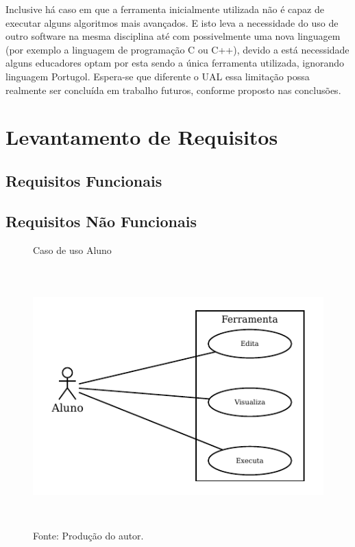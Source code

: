 Inclusive há caso em que a ferramenta inicialmente utilizada não é capaz de executar alguns algoritmos mais avançados. E isto leva a necessidade do uso de outro software na mesma disciplina até com possivelmente uma nova linguagem (por exemplo a linguagem de programação C ou C++), devido a está necessidade alguns educadores optam por esta sendo a única ferramenta utilizada, ignorando linguagem Portugol. Espera-se que diferente o UAL essa limitação possa realmente ser concluída em trabalho futuros, conforme proposto nas conclusões.

\section{Levantamento de Requisitos}


\subsection{Requisitos Funcionais}

\subsection{Requisitos Não Funcionais}

\begin{figure}[h]
  \caption{\ifdraft{\color{green}}{}Caso de uso Aluno}\label{fig:usecase}
  \centering
\includegraphics[width=.8\textwidth,height=10cm,keepaspectratio]{figures/caso-de-uso.pdf}
  \caption*{\ifdraft{\color{green}}{}\footnotesize Fonte: Produção do autor.}
\end{figure}

